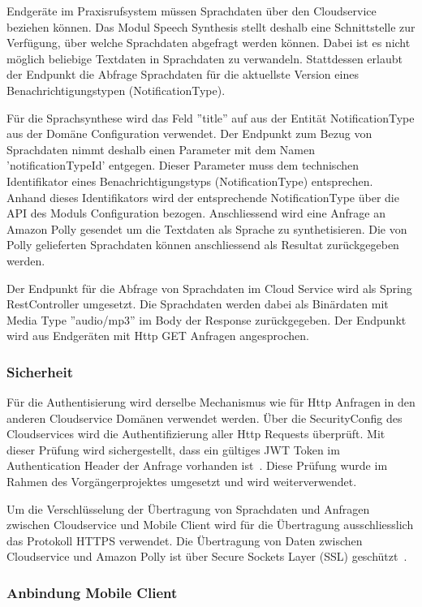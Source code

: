 Endgeräte im Praxisrufsystem müssen Sprachdaten über den Cloudservice beziehen können.
Das Modul Speech Synthesis stellt deshalb eine Schnittstelle zur Verfügung, über welche Sprachdaten abgefragt werden können.
Dabei ist es nicht möglich beliebige Textdaten in Sprachdaten zu verwandeln.
Stattdessen erlaubt der Endpunkt die Abfrage Sprachdaten für die aktuellste Version eines Benachrichtigungstypen (NotificationType).

Für die Sprachsynthese wird das Feld ''title'' auf aus der Entität NotificationType aus der Domäne Configuration verwendet.
Der Endpunkt zum Bezug von Sprachdaten nimmt deshalb einen Parameter mit dem Namen 'notificationTypeId' entgegen.
Dieser Parameter muss dem technischen Identifikator eines Benachrichtigungstyps (NotificationType) entsprechen.
Anhand dieses Identifikators wird der entsprechende NotificationType über die API des Moduls Configuration bezogen.
Anschliessend wird eine Anfrage an Amazon Polly gesendet um die Textdaten als Sprache zu synthetisieren.
Die von Polly gelieferten Sprachdaten können anschliessend als Resultat zurückgegeben werden.

Der Endpunkt für die Abfrage von Sprachdaten im Cloud Service wird als Spring RestController umgesetzt.
Die Sprachdaten werden dabei als Binärdaten mit Media Type ''audio/mp3'' im Body der Response zurückgegeben.
Der Endpunkt wird aus Endgeräten mit Http GET Anfragen angesprochen.

\subsubsection{Sicherheit}

Für die Authentisierung wird derselbe Mechanismus wie für Http Anfragen in den anderen Cloudservice Domänen verwendet werden.
Über die SecurityConfig des Cloudservices wird die Authentifizierung aller Http Requests überprüft.
Mit dieser Prüfung wird sichergestellt, dass ein gültiges JWT Token im Authentication Header der Anfrage vorhanden ist~\cite{ip5}.
Diese Prüfung wurde im Rahmen des Vorgängerprojektes umgesetzt und wird weiterverwendet.

Um die Verschlüsselung der Übertragung von Sprachdaten und Anfragen zwischen Cloudservice und Mobile Client wird für die Übertragung ausschliesslich das Protokoll HTTPS verwendet.
Die Übertragung von Daten zwischen Cloudservice und Amazon Polly ist über Secure Sockets Layer (SSL) geschützt~\cite{aws_polly_encryption_in_transit}.

\subsubsection{Anbindung Mobile Client}

